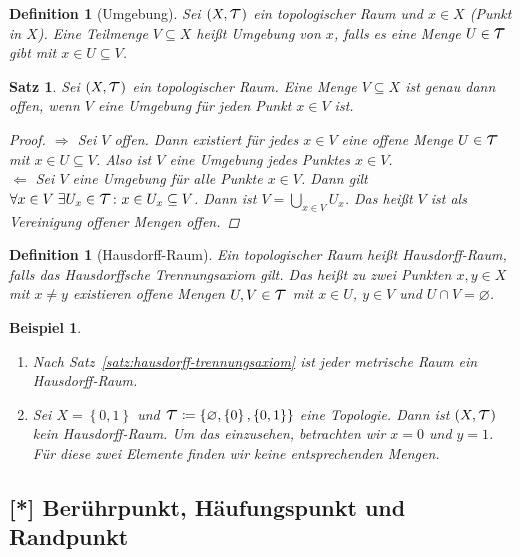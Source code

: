 \documentclass[11pt, twoside, a4paper]{article}
\theoremstyle{plain}
\newtheorem{definition}[blockelement]{Definition}
\newtheorem{satz}[blockelement]{Satz}
\newtheorem{beispiel}[blockelement]{Beispiel}
\numberwithin{equation}{subsection}
\newcommand{\set}[1]{\left\{#1\right\}}
\newcommand{\pair}[1]{\left(#1\right)}
\newcommand{\impl}[0]{\Rightarrow{}}
\renewcommand{\emptyset}{\varnothing}
\newcommand{\ex}{\;\exists}
\newcommand{\anf}[1]{\glqq{}#1\grqq}
\newcommand{\theoremescape}{\leavevmode}
\begin{document}
    \begin{definition}[Umgebung]
        Sei $\pair{X, \Tau}$ ein topologischer Raum und $x\in X$ (Punkt in $X$). Eine Teilmenge $V\subseteq X$ heißt Umgebung von $x$, falls es eine Menge $U\in\Tau$ gibt mit $x\in U \subseteq V$.
    \end{definition}

    \begin{satz} %
        Sei $\pair{X, \Tau}$ ein topologischer Raum. Eine Menge $V\subseteq X$ ist genau dann offen, wenn $V$ eine Umgebung für jeden Punkt $x\in V$ ist.
        \begin{proof}
            \anf{$\impl$} Sei $V$ offen. Dann existiert für jedes $x\in V$ eine offene Menge $U\in\Tau$ mit $x\in U\subseteq V$. Also ist $V$ eine Umgebung jedes Punktes $x\in V$.\\[.5\baselineskip]
            \anf{$\Leftarrow$} Sei $V$ eine Umgebung für alle Punkte $x\in V$. Dann gilt $\forall x\in V\ex U_x \in \Tau\colon x\in U_x \subseteq V$. Dann ist $V=\bigcup_{x\in V} U_x$. Das heißt $V$ ist als Vereinigung offener Mengen offen.
        \end{proof}
    \end{satz}

    \begin{definition}[Hausdorff-Raum]
        Ein topologischer Raum heißt Hausdorff-Raum, falls das Hausdorffsche Trennungsaxiom gilt. Das heißt zu zwei Punkten $x,y\in X$ mit $x\neq y$ existieren offene Mengen $U,V\in\Tau$ mit $x\in U$, $y\in V$ und $U\cap V = \emptyset$.
    \end{definition}

    \begin{beispiel}
        \theoremescape
        \begin{enumerate}
            \item Nach Satz~\ref{satz:hausdorff-trennungsaxiom} ist jeder metrische Raum ein Hausdorff-Raum.
            \item Sei $X=\set{0, 1}$ und $\Tau\coloneqq \set{\emptyset, \set{0}, \set{0, 1}}$ eine Topologie. Dann ist $\pair{X, \Tau}$ kein Hausdorff-Raum. Um das einzusehen, betrachten wir $x=0$ und $y=1$. Für diese zwei Elemente finden wir keine entsprechenden Mengen.
        \end{enumerate}
    \end{beispiel}

    \subsection{[*] Berührpunkt, Häufungspunkt und Randpunkt}
\end{document}
